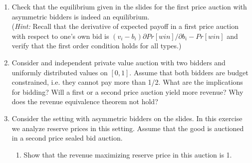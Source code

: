 \documentclass[a4paper,12pt]{article}
\begin{document}
\begin{enumerate}[resume]
\item Check that the equilibrium given in the slides for the first price auction with asymmetric bidders is indeed an equilibrium.\\
  (\emph{Hint: }Recall that the derivative of expected payoff in a first price auction with respect to one's own bid is $(v_i-b_i)\partial Pr[win]/\partial b_i-Pr[win]$ and verify that the first order condition holds for all types.)
\item Consider and independent private value auction with two bidders and uniformly distributed values on $[0,1]$. Assume that both bidders are budget constrained, i.e. they cannot pay more than 1/2. What are the implications for bidding? Will a first or a second price auction yield more revenue?  Why does the revenue equivalence theorem not hold?
\item Consider the setting with asymmetric bidders on the slides. In this exercise we analyze reserve prices in this setting. Assume that the good is auctioned in a second price sealed bid auction.
  \begin{enumerate}
  \item Show that the revenue maximizing reserve price in this auction is 1.

\end{enumerate}
\end{enumerate}
\end{document}
